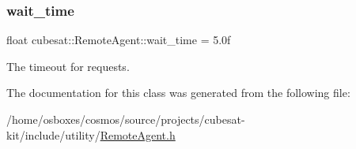 \mbox{\label{classcubesat_1_1RemoteAgent_a22d81c0c42adb6cef33cdef627631f43}} 
\subsubsection{\texorpdfstring{wait\+\_\+time}{wait\_time}}
{\footnotesize\ttfamily float cubesat\+::\+Remote\+Agent\+::wait\+\_\+time = 5.\+0f\hspace{0.3cm}{\ttfamily [protected]}}



The timeout for requests. 



The documentation for this class was generated from the following file\+:\begin{DoxyCompactItemize}
\item 
/home/osboxes/cosmos/source/projects/cubesat-\/kit/include/utility/\hyperlink{RemoteAgent_8h}{Remote\+Agent.\+h}\end{DoxyCompactItemize}

